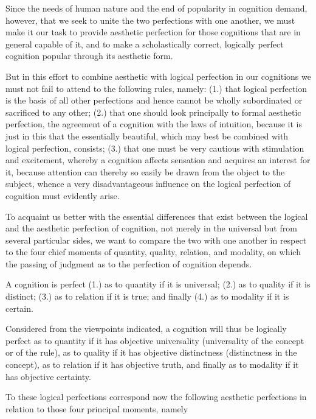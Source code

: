 Since the needs of human nature and the end of popularity in cognition
demand, however, that we seek to unite the two perfections with one
another, we must make it our task to provide aesthetic perfection for those
cognitions that are in general capable of it, and to make a scholastically
correct, logically perfect cognition popular through its aesthetic form.

But in this effort to combine aesthetic with logical perfection
in our cognitions we must not fail to attend to the following rules, namely:
(1.) that logical perfection is the basis of all other perfections and
hence cannot be wholly subordinated or sacrificed to any other;
(2.) that one should look principally to formal aesthetic perfection,
the agreement of a cognition with the laws of intuition,
because it is just in this that the essentially beautiful,
which may best be combined with logical perfection, consists;
(3.) that one must be very cautious with stimulation and excitement,
whereby a cognition affects sensation and acquires an interest for it,
because attention can thereby so easily be drawn from the object to the subject,
whence a very disadvantageous influence on
the logical perfection of cognition must evidently arise.

To acquaint us better with the essential differences that exist between
the logical and the aesthetic perfection of cognition,
not merely in the universal but from several particular sides,
we want to compare the two with one another in respect to
the four chief moments of quantity, quality, relation, and modality,
on which the passing of judgment as to the perfection of cognition depends.

A cognition is perfect
(1.) as to quantity if it is universal;
(2.) as to quality if it is distinct;
(3.) as to relation if it is true; and finally
(4.) as to modality if it is certain.

    Considered from the viewpoints indicated,
    a cognition will thus be logically perfect
    as to quantity  if it has objective universality
    (universality of the concept or of the rule),
    as to quality if it has objective distinctness
    (distinctness in the concept),
    as to relation if it has objective truth, and finally
    as to modality if it has objective certainty.

To these logical perfections correspond now the following aesthetic
perfections in relation to those four principal moments, namely

